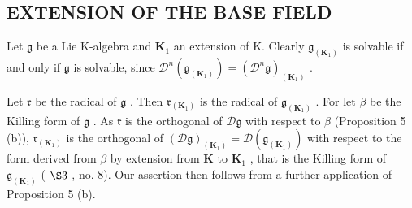 \subsection{EXTENSION OF THE BASE FIELD}

Let \(\mathfrak{g}\) be a Lie K-algebra and \(\mathbf{K}_1\) an extension of K. Clearly \(\mathfrak{g}_{(\mathbf{K}_1)}\) is solvable if and only if \(\mathfrak{g}\) is solvable, since \(\mathcal{D}^n (\mathfrak{g}_{(\mathbf{K}_1)}) = (\mathcal{D}^n\mathfrak{g})_{(\mathbf{K}_1)}\) .

Let \(\mathfrak{r}\) be the radical of \(\mathfrak{g}\) . Then \(\mathfrak{r}_{(\mathbf{K}_1)}\) is the radical of \(\mathfrak{g}_{(\mathbf{K}_1)}\) . For let \(\beta\) be the Killing form of \(\mathfrak{g}\) . As \(\mathfrak{r}\) is the orthogonal of \(\mathcal{D}\mathfrak{g}\) with respect to \(\beta\) (Proposition 5 (b)), \(\mathfrak{r}_{(\mathbf{K}_1)}\) is the orthogonal of \((\mathcal{D}\mathfrak{g})_{(\mathbf{K}_1)} = \mathcal{D}(\mathfrak{g}_{(\mathbf{K}_1)})\) with respect to the form derived from \(\beta\) by extension from \(\mathbf{K}\) to \(\mathbf{K}_1\) , that is the Killing form of \(\mathfrak{g}_{(\mathbf{K}_1)}\) ( \(\S 3\) , no. 8). Our assertion then follows from a further application of Proposition 5 (b).

